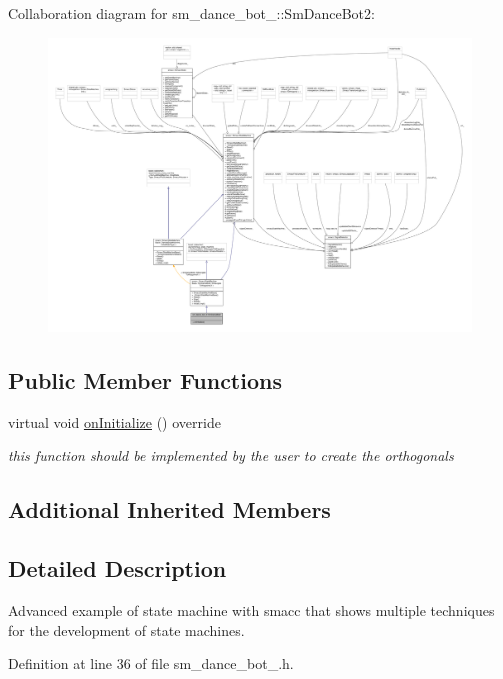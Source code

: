 Collaboration diagram for sm\+\_\+dance\+\_\+bot\+\_\+:\+:Sm\+Dance\+Bot2\+:\nopagebreak
\begin{figure}[H]
\begin{center}
\leavevmode
\includegraphics[width=350pt]{structsm__dance__bot__2_1_1SmDanceBot2__coll__graph}
\end{center}
\end{figure}
\subsection*{Public Member Functions}
\begin{DoxyCompactItemize}
\item 
virtual void \hyperlink{structsm__dance__bot__2_1_1SmDanceBot2_a15cabce5763a486bf6ace2ed5850480c}{on\+Initialize} () override
\begin{DoxyCompactList}\small\item\em this function should be implemented by the user to create the orthogonals \end{DoxyCompactList}\end{DoxyCompactItemize}
\subsection*{Additional Inherited Members}


\subsection{Detailed Description}
Advanced example of state machine with smacc that shows multiple techniques for the development of state machines. 

Definition at line 36 of file sm\+\_\+dance\+\_\+bot\+\_.\+h.



